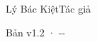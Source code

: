 \begin{titlepage}
\vfill
{\LARGE\sffamily Lý Bác Kiệt\quad Tác giả\par}
\vspace{0.7cm}
{\small\sffamily\color{structurecolor!80} Bản v1.2 · \number\year-\number\month-\number\day\par}
\vspace{1.2cm}
\end{titlepage}
